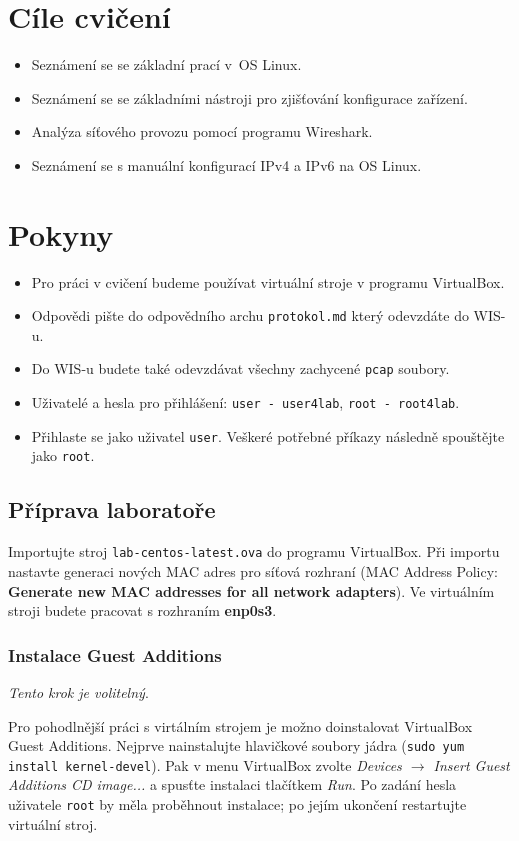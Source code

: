 \section*{Cíle cvičení}
\begin{itemize}
	\item Seznámení se se základní prací v~OS Linux.
	\item Seznámení se se základními nástroji pro zjišťování konfigurace zařízení.
	\item Analýza síťového provozu pomocí programu Wireshark.
	\item Seznámení se s manuální konfigurací IPv4 a IPv6 na OS Linux.
\end{itemize}

\section*{Pokyny}
\begin{itemize}
\item Pro práci v cvičení budeme používat virtuální stroje v programu VirtualBox.
\item Odpovědi pište do odpovědního archu \texttt{protokol.md} který odevzdáte do WIS-u.
\item Do WIS-u budete také odevzdávat všechny zachycené \texttt{pcap} soubory.
\item Uživatelé a hesla pro přihlášení: \texttt{user - user4lab}, \texttt{root - root4lab}.
\item Přihlaste se jako uživatel \texttt{user}. Veškeré potřebné příkazy následně spouštějte jako \texttt{root}.
\end{itemize}

\subsection*{Příprava laboratoře}
Importujte stroj \texttt{lab-centos-latest.ova} do programu VirtualBox.
Při importu nastavte generaci nových MAC adres pro síťová rozhraní (MAC Address Policy: \textbf{Generate new MAC addresses for all network adapters}).
Ve virtuálním stroji budete pracovat s rozhraním {\bf enp0s3}.

\subsubsection*{Instalace Guest Additions}
\textit{Tento krok je volitelný}.

Pro pohodlnější práci s virtálním strojem je možno doinstalovat VirtualBox Guest Additions.
Nejprve nainstalujte hlavičkové soubory jádra (\texttt{sudo yum install kernel-devel}).
Pak v menu VirtualBox zvolte \textit{Devices $\rightarrow$ Insert Guest Additions CD image...} a spusťte instalaci tlačítkem \textit{Run}.
Po zadání hesla uživatele \texttt{root} by měla proběhnout instalace; po jejím ukončení restartujte virtuální stroj.

